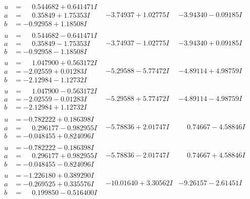 \documentclass[1p]{elsarticle_modified}
\theoremstyle{definition}
\begin{document}
$$\begin{array}{c|c|c}
\begin{aligned}
u &= \phantom{-}0.544682 + 0.641471 I \\
a &= \phantom{-}0.35849 + 1.75353 I \\
b &= -0.92958 + 1.18508 I\end{aligned}
 & -3.74937 + 1.02775 I & -3.94340 - 0.09185 I \\ \hline\begin{aligned}
u &= \phantom{-}0.544682 - 0.641471 I \\
a &= \phantom{-}0.35849 - 1.75353 I \\
b &= -0.92958 - 1.18508 I\end{aligned}
 & -3.74937 - 1.02775 I & -3.94340 + 0.09185 I \\ \hline\begin{aligned}
u &= \phantom{-}1.047900 + 0.563172 I \\
a &= -2.02559 + 0.01283 I \\
b &= -2.12984 - 1.12732 I\end{aligned}
 & -5.29588 - 5.77472 I & -4.89114 + 4.98759 I \\ \hline\begin{aligned}
u &= \phantom{-}1.047900 - 0.563172 I \\
a &= -2.02559 - 0.01283 I \\
b &= -2.12984 + 1.12732 I\end{aligned}
 & -5.29588 + 5.77472 I & -4.89114 - 4.98759 I \\ \hline\begin{aligned}
u &= -0.782222 + 0.186398 I \\
a &= \phantom{-}0.296177 - 0.982955 I \\
b &= -0.048455 + 0.824096 I\end{aligned}
 & -5.78836 + 2.01747 I & \phantom{-}0.74667 - 4.58846 I \\ \hline\begin{aligned}
u &= -0.782222 - 0.186398 I \\
a &= \phantom{-}0.296177 + 0.982955 I \\
b &= -0.048455 - 0.824096 I\end{aligned}
 & -5.78836 - 2.01747 I & \phantom{-}0.74667 + 4.58846 I \\ \hline\begin{aligned}
u &= -1.226180 + 0.389290 I \\
a &= -0.269525 + 0.335576 I \\
b &= \phantom{-}0.199850 - 0.516400 I\end{aligned}
 & -10.01640 + 3.30562 I & -9.26157 - 2.61451 I \\ \hline\begin{aligned}

\end{aligned}
\end{array}$$
\end{document}
